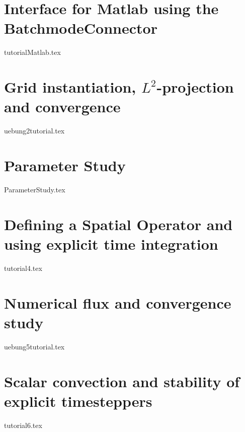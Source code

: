 \documentclass[a4paper,10pt]{report} %
\begin{document}
\chapter{Interface for Matlab using the BatchmodeConnector}
\label{Matlab}
{tutorialMatlab.tex}

\chapter{Grid instantiation, $L^2$-projection and convergence}
\label{GridInstantiation}
{uebung2tutorial.tex}

\chapter{Parameter Study}
\label{sec:Parameterstudy}
{ParameterStudy.tex}

\chapter{Defining a Spatial Operator and using explicit time integration}
\label{SpatialOperator}
{tutorial4.tex}


\chapter{Numerical flux and convergence study}
\label{NumFlux}
{uebung5tutorial.tex}


\chapter{Scalar convection and stability of explicit timesteppers}
\label{ScalarAdvection}
{tutorial6.tex}
\end{document}
